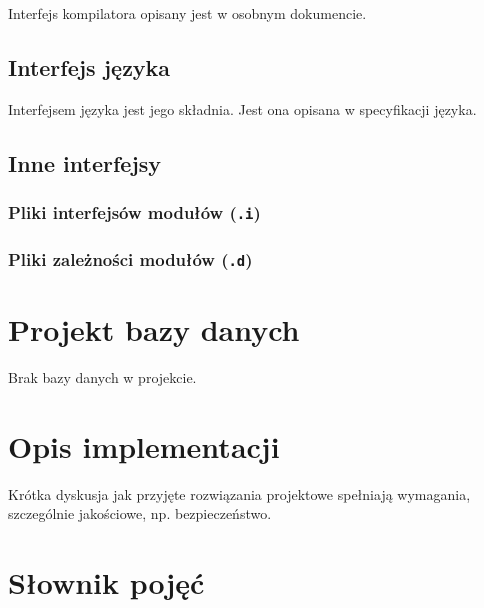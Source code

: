 \documentclass[11pt,oneside,a4paper,titlepage,onecolumn]{article}
\begin{document}
Interfejs kompilatora opisany jest w osobnym dokumencie.

\subsection{Interfejs języka}

Interfejsem języka jest jego składnia.
Jest ona opisana w specyfikacji języka.

\subsection{Inne interfejsy}

\subsubsection{Pliki interfejsów modułów (\texttt{.i})}
\label{pliki_interfejsow_modulow}

\subsubsection{Pliki zależności modułów (\texttt{.d})}
\label{pliki_zaleznosci_modulow}

\section{Projekt bazy danych}

Brak bazy danych w projekcie.

\section{Opis implementacji}

Krótka dyskusja jak przyjęte rozwiązania projektowe spełniają wymagania, szczególnie jakościowe, np.
bezpieczeństwo.

\section{Słownik pojęć}
\end{document}
